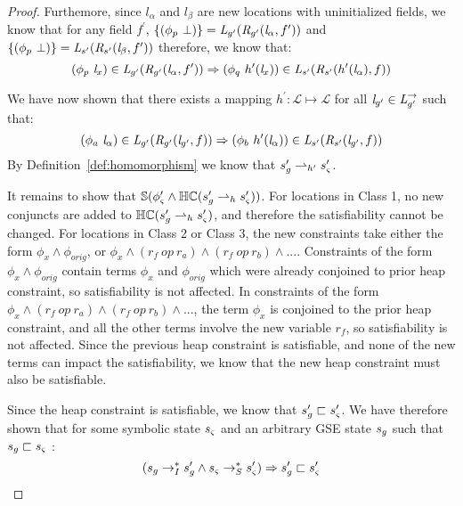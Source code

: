 \begin{proof}
Furthemore, since $l_\alpha$ and $l_\beta$ are new locations with uninitialized fields, we know that for any field $f^\prime$, $\{(\phi_p\ \bot)\} = \emph{L}_{g^\prime}(\emph{R}_{g^\prime} (\emph{l}_\alpha,f^\prime ))$ and $ \{(\phi_p\ \bot)\} = \emph{L}_{s^\prime}(\emph{R}_{s^\prime} (\emph{l}_\beta,f^\prime ))$ therefore, we know that:
$$(\phi_p\ \emph{l}_x) \in \emph{L}_{g^\prime}(\emph{R}_{g^\prime} (\emph{l}_\alpha,f^\prime )) \Rightarrow (\phi_q\ h^\prime (\emph{l}_x))\in \emph{L}_{s^\prime}(\emph{R}_{s^\prime} ( h^\prime(\emph{l}_\alpha),f ))$$

We have now shown that there exists a mapping $h^\prime: \mathcal{L} \mapsto \mathcal{L}$ for all $\emph{l}_{g^\prime} \in \emph{L}_{g^\prime}^\rightarrow$ such that:
$$ (\phi_a\ \emph{l}_\alpha) \in \emph{L}_{g^\prime}(\emph{R}_{g^\prime} (\emph{l}_{g^\prime},f )) \Rightarrow (\phi_b\ h^\prime (\emph{l}_\alpha))\in \emph{L}_{s^\prime}(\emph{R}_{s^\prime} (\emph{l}_{g^\prime},f )) $$
By Definition~\ref{def:homomorphism} we know that $s_{g}^\prime \rightharpoonup_{h^\prime} s_{\varsigma}^\prime$. 

It remains to show that $\mathbb{S}( \phi_{\varsigma}^\prime \wedge \mathbb{HC}(s_{g}^\prime \rightharpoonup_{h} s_{\varsigma}^\prime) )$. For locations in Class 1, no new conjuncts are added to $\mathbb{HC}(s_{g}^\prime \rightharpoonup_{h} s_{\varsigma}^\prime)$, and therefore the satisfiability cannot be changed. For locations in Class 2 or Class 3, the new constraints take either the form $\phi_x \wedge \phi_\mathit{orig}$, or $\phi_x \wedge (r_f\ op\ r_{a}) \wedge (r_f\ op\ r_{b}) \wedge ...$. Constraints of the form  $\phi_x \wedge \phi_\mathit{orig}$ contain terms $\phi_x$ and $\phi_\mathit{orig}$ which were already conjoined to prior heap constraint, so satisfiability is not affected. In constraints of the form $\phi_x \wedge (r_f\ op\ r_{a}) \wedge (r_f\ op\ r_{b}) \wedge ...$, the term $\phi_x$ is conjoined to the prior heap constraint, and all the other terms involve the new variable $r_f$, so satisfiability is not affected. Since the previous heap constraint is satisfiable, and none of the new terms can impact the satisfiability, we know that the new heap constraint must also be satisfiable.

Since the heap constraint is satisfiable, we know that $s_{g}^\prime \sqsubset s_{\varsigma}^\prime $. We have therefore shown that for some symbolic state $s_{\varsigma}$ and an arbitrary GSE state $s_{g}$ such that $s_{g} \sqsubset s_{\varsigma}$ :
\begin{equation} 
(s_{g} \rightarrow_I^* s_{g}^\prime \wedge s_{\varsigma} \rightarrow_S^* s_{\varsigma}^\prime) \Rightarrow s_{g}^\prime \sqsubset s_{\varsigma}^\prime 
\end{equation}


\end{proof}
